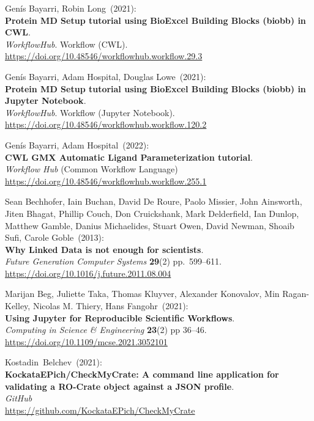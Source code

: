 \begin{thebibliography}{9}
Genís Bayarri, Robin Long~(2021):\\
\textbf{Protein MD Setup tutorial using BioExcel Building Blocks (biobb)
in CWL}.\\
\emph{WorkflowHub}. Workflow (CWL).\\
\url{https://doi.org/10.48546/workflowhub.workflow.29.3}

Genís Bayarri, Adam Hospital, Douglas Lowe~(2021):\\
\textbf{Protein MD Setup tutorial using BioExcel Building Blocks (biobb)
in Jupyter Notebook}.\\
\emph{WorkflowHub}. Workflow (Jupyter Notebook).\\
\url{https://doi.org/10.48546/workflowhub.workflow.120.2}

Genís Bayarri, Adam Hospital~(2022):\\
\textbf{CWL GMX Automatic Ligand Parameterization tutorial}.\\
\emph{Workflow Hub} (Common Workflow Language)\\
\url{https://doi.org/10.48546/workflowhub.workflow.255.1}

Sean Bechhofer, Iain Buchan, David De Roure, Paolo Missier,
John Ainsworth, Jiten Bhagat, Phillip Couch, Don Cruickshank, Mark
Delderfield, Ian Dunlop, Matthew Gamble, Danius Michaelides, Stuart
Owen, David Newman, Shoaib Sufi, Carole Goble~(2013):\\
\textbf{Why Linked Data is not enough for scientists}.\\
\emph{Future Generation Computer Systems} \textbf{29}(2)
pp.~599--611.\\
\url{https://doi.org/10.1016/j.future.2011.08.004}

Marijan Beg, Juliette Taka, Thomas Kluyver, Alexander
Konovalov, Min Ragan-Kelley, Nicolas M. Thiery, Hans Fangohr~(2021):\\
\textbf{Using Jupyter for Reproducible Scientific Workflows}.\\
\emph{Computing in Science \& Engineering} \textbf{23}(2) pp 36--46.\\
\url{https://doi.org/10.1109/mcse.2021.3052101}

Kostadin~Belchev~(2021):\\
\textbf{KockataEPich/CheckMyCrate: A command line application for
validating a RO-Crate object against a JSON profile}.\\
\emph{GitHub}\\
\url{https://github.com/KockataEPich/CheckMyCrate}


\end{thebibliography}
